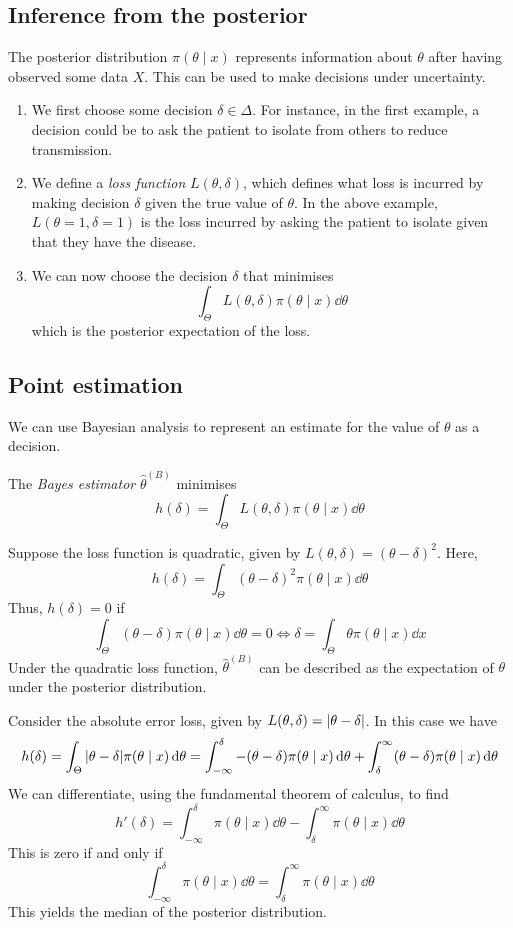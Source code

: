 \subsection{Inference from the posterior}
The posterior distribution \( \pi(\theta \mid x) \) represents information about \( \theta \) after having observed some data \( X \).
This can be used to make decisions under uncertainty.
\begin{enumerate}
	\item We first choose some decision \( \delta \in \Delta \).
		For instance, in the first example, a decision could be to ask the patient to isolate from others to reduce transmission.
	\item We define a \textit{loss function} \( L(\theta,\delta) \), which defines what loss is incurred by making decision \( \delta \) given the true value of \( \theta \).
		In the above example, \( L(\theta = 1, \delta = 1) \) is the loss incurred by asking the patient to isolate given that they have the disease.
	\item We can now choose the decision \( \delta \) that minimises
		\[ \int_\Theta L(\theta, \delta) \pi(\theta \mid x) \dd{\theta} \]
		which is the posterior expectation of the loss.
\end{enumerate}

\subsection{Point estimation}
We can use Bayesian analysis to represent an estimate for the value of \( \theta \) as a decision.
\begin{definition}
	The \textit{Bayes estimator} \( \hat \theta^{(B)} \) minimises
	\[ h(\delta) = \int_\Theta L(\theta, \delta) \pi(\theta \mid x) \dd{\theta} \]
\end{definition}
\begin{example}
	Suppose the loss function is quadratic, given by \( L(\theta, \delta) = (\theta-\delta)^2 \).
	Here,
	\[ h(\delta) = \int_\Theta (\theta - \delta)^2 \pi(\theta \mid x) \dd{\theta} \]
	Thus, \( h(\delta) = 0 \) if
	\[ \int_\Theta (\theta - \delta) \pi(\theta \mid x) \dd{\theta} = 0 \iff \delta = \int_\Theta \theta \pi(\theta \mid x) \dd{x} \]
	Under the quadratic loss function, \( \hat \theta^{(B)} \) can be described as the expectation of \( \theta \) under the posterior distribution.
\end{example}
\begin{example}
	Consider the absolute error loss, given by \( L(\theta, \delta) = \abs{\theta - \delta} \).
	In this case we have
	\[ h(\delta) = \int_\Theta \abs{\theta - \delta} \pi(\theta \mid x) \dd{\theta} = \int_{-\infty}^\delta -(\theta-\delta)\pi(\theta \mid x)\dd{\theta} + \int_\delta^\infty (\theta-\delta)\pi(\theta \mid x)\dd{\theta} \]
	We can differentiate, using the fundamental theorem of calculus, to find
	\[ h'(\delta) = \int_{-\infty}^\delta \pi(\theta\mid x) \dd{\theta} - \int_\delta^\infty \pi(\theta \mid x)\dd{\theta} \]
	This is zero if and only if
	\[ \int_{-\infty}^\delta \pi(\theta\mid x) \dd{\theta} = \int_\delta^{\infty} \pi(\theta \mid x) \dd{\theta} \]
	This yields the median of the posterior distribution.
\end{example}

